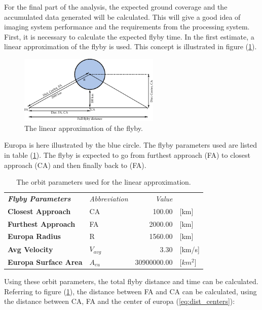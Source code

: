 For the final part of the analysis, the expected ground coverage and the accumulated data generated will be calculated. This will give a good idea of imaging system performance and the requirements from the processing system. First, it is necessary to calculate the expected flyby time. In the first estimate, a linear approximation of the flyby is used. This concept is illustrated in figure (\ref{fig:linear_flyby}). 
\begin{figure}[htb]
\centering
\includegraphics[width=0.6\textwidth]{figures/Orbiter/linear_flyby.pdf}
\caption{The linear approximation of the flyby.}
\label{fig:linear_flyby}
\end{figure}
Europa is here illustrated by the blue circle. The flyby parameters used are listed in table (\ref{tab:orbit_parameters_linear}). %
The flyby is expected to go from furthest approach (FA) to closest approach (CA) and then finally back to (FA).
\begin{table}[htb]
  \centering
    \begin{tabular}{l|l|r|l}
\textit{\textbf{Flyby Parameters}} & \textit{Abbreviation} & \multicolumn{1}{r}{\textit{Value}} &  \bigstrut[b]\\
\cline{1-3}\textbf{Closest Approach} & CA    & 100.00 & [km] \bigstrut[t]\\
\textbf{Furthest Approach} & FA    & 2000.00 & [km] \\
\textbf{Europa Radius} & R     & 1560.00 & [km] \\
\textbf{Avg Velocity} & $V_{avg}$ & 3.30  & [km/s] \\
\textbf{Europa Surface Area} & $A_{eu}$ & 30900000.00 & [$km^2$] \\
\end{tabular}%
    \caption{The orbit parameters used for the linear approximation.}
  \label{tab:orbit_parameters_linear}%
\end{table}%
Using these orbit parameters, the total flyby distance and time can be calculated. Referring to figure (\ref{fig:linear_flyby}), the distance between FA and CA can be calculated, using the distance between CA, FA and the center of europa (\ref{eq:dist_centers}):

